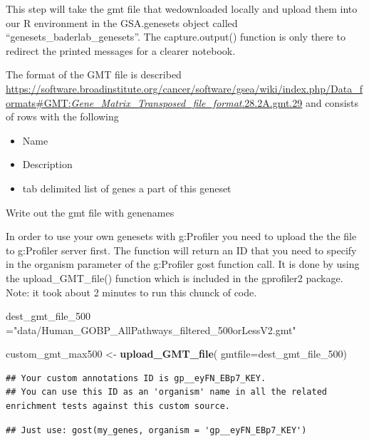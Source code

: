 \documentclass[
]{book}
\newenvironment{Shaded}{\begin{snugshade}}{\end{snugshade}}
\newcommand{\AttributeTok}[1]{\textcolor[rgb]{0.13,0.29,0.53}{#1}}
\newcommand{\FunctionTok}[1]{\textcolor[rgb]{0.13,0.29,0.53}{\textbf{#1}}}
\newcommand{\NormalTok}[1]{#1}
\newcommand{\OtherTok}[1]{\textcolor[rgb]{0.56,0.35,0.01}{#1}}
\newcommand{\StringTok}[1]{\textcolor[rgb]{0.31,0.60,0.02}{#1}}
\providecommand{\tightlist}{%
  \setlength{\itemsep}{0pt}\setlength{\parskip}{0pt}}
\begin{document}
This step will take the gmt file that wedownloaded locally and upload them into our R environment in the GSA.genesets object called ``genesets\_baderlab\_genesets''.
The capture.output() function is only there to redirect the printed messages for a clearer notebook.

The format of the GMT file is described \href{here}{https://software.broadinstitute.org/cancer/software/gsea/wiki/index.php/Data\_formats\#GMT:\emph{Gene\_Matrix\_Transposed\_file\_format}.28.2A.gmt.29} and consists of rows with the following

\begin{itemize}
\tightlist
\item
  Name
\item
  Description
\item
  tab delimited list of genes a part of this geneset
\end{itemize}

Write out the gmt file with genenames

In order to use your own genesets with g:Profiler you need to upload the the file to g:Profiler server first. The function will return an ID that you need to specify in the organism parameter of the g:Profiler gost function call.
It is done by using the upload\_GMT\_file() function which is included in the gprofiler2 package.
Note: it took about 2 minutes to run this chunck of code.

\begin{Shaded}
\begin{Highlighting}[]
\NormalTok{dest\_gmt\_file\_500 }\OtherTok{=}\StringTok{"data/Human\_GOBP\_AllPathways\_filtered\_500orLessV2.gmt"}

\NormalTok{custom\_gmt\_max500 }\OtherTok{\textless{}{-}} \FunctionTok{upload\_GMT\_file}\NormalTok{(}
                        \AttributeTok{gmtfile=}\NormalTok{dest\_gmt\_file\_500)}
\end{Highlighting}
\end{Shaded}

\begin{verbatim}
## Your custom annotations ID is gp__eyFN_EBp7_KEY.
## You can use this ID as an 'organism' name in all the related enrichment tests against this custom source.
\end{verbatim}

\begin{verbatim}
## Just use: gost(my_genes, organism = 'gp__eyFN_EBp7_KEY')
\end{verbatim}
\end{document}
